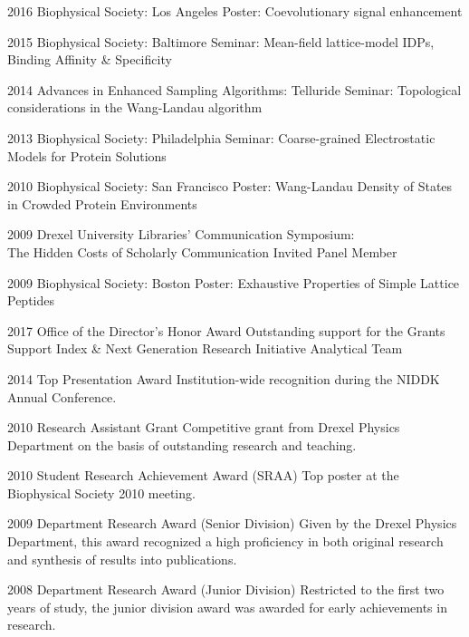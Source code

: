 \documentclass[]{scrartcl}
\begin{document}
\begin{cleanCV}


\WorkExperienceX
{2016}
{Biophysical Society: Los Angeles}
{Poster: Coevolutionary signal enhancement}

\WorkExperienceX
{2015}
{Biophysical Society: Baltimore}
{Seminar: Mean-field lattice-model IDPs, Binding Affinity \& Specificity}

\WorkExperienceX
{2014}
{Advances in Enhanced Sampling Algorithms: Telluride}
{Seminar: Topological considerations in the Wang-Landau algorithm}

\WorkExperienceX
{2013}
{Biophysical Society: Philadelphia}
{Seminar: Coarse-grained Electrostatic Models for Protein Solutions}

\WorkExperienceX
{2010}
{Biophysical Society: San Francisco}
{Poster: Wang-Landau Density of States in Crowded Protein Environments}

\WorkExperienceX
{2009}
{Drexel University Libraries' Communication Symposium:\\The Hidden Costs of Scholarly Communication}
{Invited Panel Member}

\WorkExperienceX
{2009}
{Biophysical Society: Boston}
{Poster: Exhaustive Properties of Simple Lattice Peptides}

\pagebreak

\pagebreak


\WorkExperienceX
{2017}
{Office of the Director's Honor Award}
{Outstanding support for the Grants Support Index \& Next Generation Research Initiative Analytical Team}

\WorkExperienceX
{2014}
{Top Presentation Award}
{Institution-wide recognition during the NIDDK Annual Conference.}

\WorkExperienceX
{2010}
{Research Assistant Grant}
{Competitive grant from Drexel Physics Department on the basis of outstanding research and teaching.}

\WorkExperienceX
{2010}
{Student Research Achievement Award (SRAA)}
{Top poster at the Biophysical Society 2010 meeting. }

\WorkExperienceX
{2009}
{Department Research Award (Senior Division)}
{Given by the Drexel Physics Department, this award recognized a high proficiency in both original research and synthesis of results into publications.}

\WorkExperienceX
{2008}
{Department Research Award (Junior Division)}
{Restricted to the first two years of study, the junior division award was awarded for early achievements in research.}


\end{cleanCV}
\end{document}
